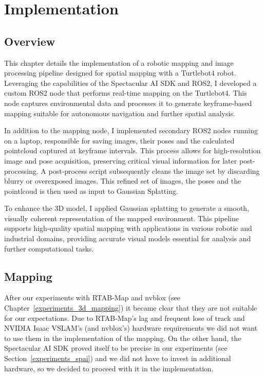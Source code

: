 \chapter{Implementation} \label{implementation}


\section{Overview}

This chapter details the implementation of a robotic mapping and image processing pipeline designed for spatial mapping with a Turtlebot4 robot. Leveraging the capabilities of the Spectacular AI SDK and ROS2, I developed a custom ROS2 node that performs real-time mapping on the Turtlebot4. This node captures environmental data and processes it to generate keyframe-based mapping suitable for autonomous navigation and further spatial analysis.

In addition to the mapping node, I implemented secondary ROS2 nodes running on a laptop, responsible for saving images, their poses and the calculated pointcloud captured at keyframe intervals. This process allows for high-resolution image and pose acquisition, preserving critical visual information for later post-processing. A post-process script subsequently cleans the image set by discarding blurry or overexposed images. This refined set of images, the poses and the pointlcoud is then used as input to Gaussian Splatting.

To enhance the 3D model, I applied Gaussian splatting to generate a smooth, visually coherent representation of the mapped environment. This pipeline supports high-quality spatial mapping with applications in various robotic and industrial domains, providing accurate visual models essential for analysis and further computational tasks.

\section{Mapping}

After our experiments with RTAB-Map and nvblox (see Chapter~\ref{experiments_3d_mapping}) it became clear that they are not suitable for our expectations. Due to RTAB-Map's lag and frequent lose of track and NVIDIA Isaac VSLAM's (and nvblox's) hardware requirements we did not want to use them in the implementation of the mapping. On the other hand, the Spectacular AI SDK proved itself to be precise in our experiments (see Section~\ref{experiments_spai}) and we did not have to invest in additional hardware, so we decided to proceed with it in the implementation. 

